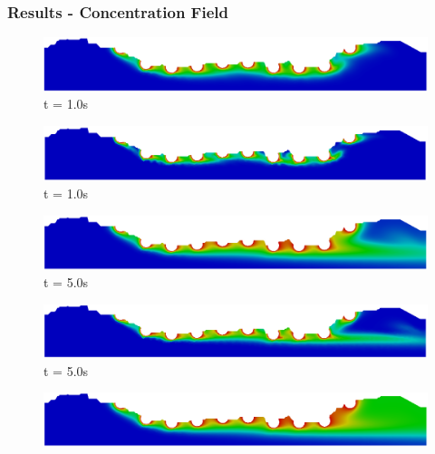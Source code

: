 \begin{frame}
 \frametitle{\LARGE Results - Concentration Field}
\vspace{-0.7cm}
\begin{figure}
     \begin{minipage}{.50\linewidth}
      \centering
      \includegraphics[scale=0.12]{images/conc1_RealStrut3.png}\\
      \tiny t = 1.0s
     \end{minipage}%
     \begin{minipage}{.50\linewidth}
      \centering
      \includegraphics[scale=0.12]{images/conc10_RealStrut3.png}\\
      \tiny t = 1.0s
     \end{minipage}
     \begin{minipage}{.50\linewidth}
     \medskip
      \centering
      \includegraphics[scale=0.12]{images/conc1_RealStrut5.png}\\
      \tiny t = 5.0s
     \end{minipage}%
     \begin{minipage}{.50\linewidth}
     \medskip
      \centering
      \includegraphics[scale=0.12]{images/conc10_RealStrut5.png}\\
      \tiny t = 5.0s
     \end{minipage}
     \begin{minipage}{.50\linewidth}
      \centering
      \includegraphics[scale=0.12]{images/conc1_RealStrut8.png}\\

\end{minipage}
\end{figure}
\end{frame}

